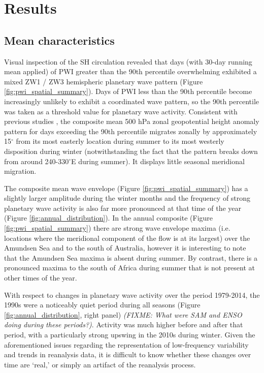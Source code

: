 \section{Results}

\subsection{Mean characteristics}

Visual inspection of the SH circulation revealed that days (with 30-day running mean applied) of PWI greater than the 90th percentile overwhelming exhibited a mixed ZW1 / ZW3 hemispheric planetary wave pattern (Figure \ref{fig:pwi_spatial_summary}). Days of PWI less than the 90th percentile become increasingly unlikely to exhibit a coordinated wave pattern, so the 90th percentile was taken as a threshold value for planetary wave activity. Consistent with previous studies \citep{vanLoon1984,Mo1985}, the composite mean 500 hPa zonal geopotential height anomaly pattern for days exceeding the 90th percentile migrates zonally by approximately 15$^{\circ}$ from its most easterly location during summer to its most westerly disposition during winter (notwithstanding the fact that the pattern breaks down from around 240-330$^{\circ}$E during summer). It displays little seasonal meridional migration.

The composite mean wave envelope (Figure \ref{fig:pwi_spatial_summary}) has a slightly larger amplitude during the winter months and the frequency of strong planetary wave activity is also far more pronounced at that time of the year (Figure \ref{fig:annual_distribution}). In the annual composite (Figure \ref{fig:pwi_spatial_summary}) there are strong wave envelope maxima (i.e. locations where the meridional component of the flow is at its largest) over the Amundsen Sea and to the south of Australia, however it is interesting to note that the Amundsen Sea maxima is absent during summer. By contrast, there is a pronounced maxima to the south of Africa during summer that is not present at other times of the year.

With respect to changes in planetary wave activity over the period 1979-2014, the 1990s were a noticeably quiet period during all seasons (Figure \ref{fig:annual_distribution}, right panel) \textit{(FIXME: What were SAM and ENSO doing during these periods?)}. Activity was much higher before and after that period, with a particularly strong upswing in the 2010s during winter. Given the aforementioned issues regarding the representation of low-frequency variability and trends in reanalysis data, it is difficult to know whether these changes over time are `real,' or simply an artifact of the reanalysis process.
